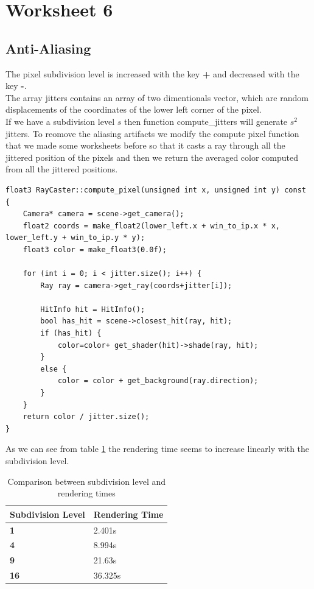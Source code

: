 \section{Worksheet 6}
\subsection{Anti-Aliasing}
The pixel subdivision level is increased with the key \textbf{+} and decreased with the key \textbf{-}.\\
The array jitters contains an array of two dimentionals vector, which are random displacements of the coordinates of the lower left corner of the pixel.\\
If we have a subdivision level $s$ then function compute\_jitters will generate $s^2$ jitters. 
To reomove the aliasing artifacts we modify the compute pixel function that we made some worksheets before so that it casts a ray through all the jittered position of the pixels and then we return the averaged color computed from all the jittered positions.
\begin{lstlisting}
float3 RayCaster::compute_pixel(unsigned int x, unsigned int y) const
{
	Camera* camera = scene->get_camera();
	float2 coords = make_float2(lower_left.x + win_to_ip.x * x, lower_left.y + win_to_ip.y * y);
	float3 color = make_float3(0.0f);
	
	for (int i = 0; i < jitter.size(); i++) {
		Ray ray = camera->get_ray(coords+jitter[i]);
		
		HitInfo hit = HitInfo();
		bool has_hit = scene->closest_hit(ray, hit);
		if (has_hit) {
			color=color+ get_shader(hit)->shade(ray, hit);
		}
		else {
			color = color + get_background(ray.direction);
		}
	}
	return color / jitter.size();
}
\end{lstlisting}
As we can see from table \ref{table:time_comparison}  the rendering time seems to increase linearly with the subdivision level.
\begin{table}[H]
	\centering
	\begin{tabular}{|l|l|}
		\hline
		\textbf{Subdivision Level} & \textbf{Rendering Time} \\ \hline
		\textbf{1}                 & 2.401s                  \\ \hline
		\textbf{4}                 & 8.994s                  \\ \hline
		\textbf{9}                 & 21.63s                  \\ \hline
		\textbf{16}                & 36.325s                 \\ \hline
	\end{tabular}
	\caption{Comparison between subdivision level and rendering times}
	\label{table:time_comparison}
\end{table}
